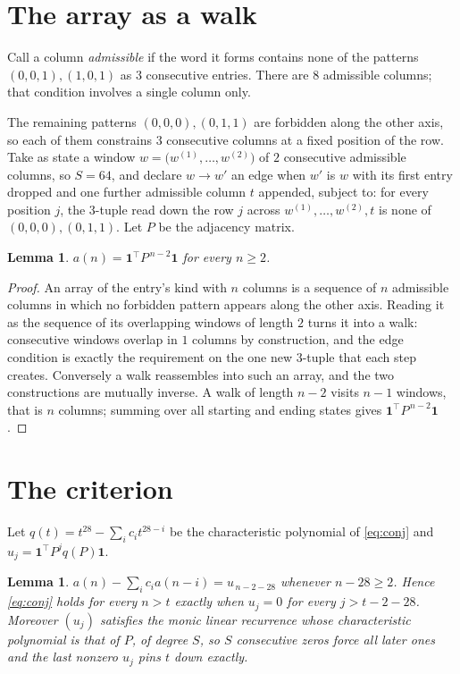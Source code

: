 \documentclass[11pt,a4paper]{article}
\theoremstyle{plain}
\newtheorem{lemma}[theorem]{Lemma}
\theoremstyle{definition}
\begin{document}
\section{The array as a walk}

Call a column \emph{admissible} if the word it forms contains none of the patterns
$(0,0,1), (1,0,1)$ as $3$ consecutive entries. There are $8$ admissible columns; that condition
involves a single column only.

The remaining patterns $(0,0,0), (0,1,1)$ are forbidden along the other axis, so each of them
constrains $3$ consecutive columns at a fixed position of the row. Take as state a
window $w=\bigl(w^{(1)},\dots,w^{(2)}\bigr)$ of $2$ consecutive admissible
columns, so $S=64$, and declare $w\to w'$ an edge when $w'$ is $w$ with its first entry
dropped and one further admissible column $t$ appended, subject to: for every position
$j$, the $3$-tuple read down the row $j$ across $w^{(1)},\dots,w^{(2)},t$
is none of $(0,0,0), (0,1,1)$. Let $P$ be the adjacency matrix.

\begin{lemma}\label{lem:walk}
$a(n)=\mathbf{1}^{\!\top}P^{\,n-2}\mathbf{1}$ for every $n\ge2$.
\end{lemma}

\begin{proof}
An array of the entry's kind with $n$ columns is a sequence of $n$ admissible columns in
which no forbidden pattern appears along the other axis. Reading it as the sequence of its
overlapping windows of length $2$ turns it into a walk: consecutive windows overlap in
$1$ columns by construction, and the edge condition is exactly the requirement on the one
new $3$-tuple that each step creates. Conversely a walk reassembles into such an array,
and the two constructions are mutually inverse. A walk of length $n-2$ visits $n-1$
windows, that is $n$ columns; summing over all starting and ending states gives
$\mathbf{1}^{\!\top}P^{\,n-2}\mathbf{1}$.
\end{proof}

\section{The criterion}

Let $q(t)=t^{28}-\sum_i c_i t^{28-i}$ be the characteristic polynomial of
\eqref{eq:conj} and $u_j=\mathbf{1}^{\!\top}P^{j}q(P)\mathbf{1}$.

\begin{lemma}\label{lem:crit}
$a(n)-\sum_i c_i a(n-i)=u_{\,n-2-28}$ whenever $n-28\ge2$. Hence
\eqref{eq:conj} holds for every $n>t$ exactly when $u_j=0$ for every
$j>t-2-28$. Moreover $(u_j)$ satisfies the monic linear recurrence whose
characteristic polynomial is that of $P$, of degree $S$, so $S$ consecutive zeros force all
later ones and the last nonzero $u_j$ pins $t$ down exactly.
\end{lemma}
\end{document}
